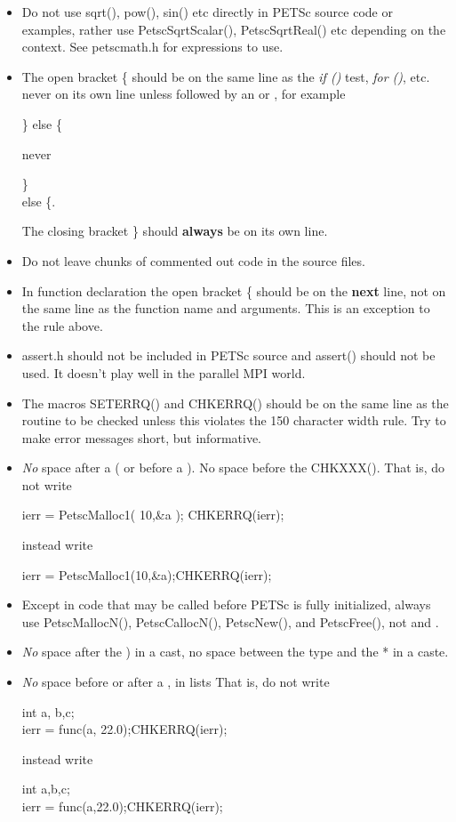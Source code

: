\documentclass[twoside,12pt]{../sty/report_petsc}
\begin{document}
\begin{itemize}
\item Do not use sqrt(), pow(), sin() etc directly in PETSc source code or examples, rather use PetscSqrtScalar(), PetscSqrtReal() etc depending on the context. See petscmath.h for expressions to use.
\item The open bracket \{ should be on the same line as the {\em if ()} test, {\em for ()}, etc. never on
      its own line unless followed by an  or , for example
\begin{tabbing}
   \} else \{ \\
\end{tabbing}
never
\begin{tabbing}
   \} \\
   else \{.
\end{tabbing}
 The closing bracket \} should {\bf always} be on its own line.
\item Do not leave chunks of commented out code in the source files.
\item In function declaration the open bracket \{ should be on the {\bf next} line, not on the same line as the function name and
      arguments. This is an exception to the rule above.
\item assert.h should not be included in PETSc source and assert() should not be used. It doesn't play well in the parallel MPI world.
\item The macros SETERRQ() and CHKERRQ() should be on the
      same line as the routine to be checked unless this violates the
      150 character width rule. Try to make error messages short, but
      informative.
\item {\em No} space after a ( or before a ). No space before the CHKXXX(). That is, do not write
\begin{tabbing}
   ierr = PetscMalloc1( 10,\&a ); CHKERRQ(ierr);
\end{tabbing}
instead write
\begin{tabbing}
   ierr = PetscMalloc1(10,\&a);CHKERRQ(ierr);
\end{tabbing}
\item Except in code that may be called before PETSc is fully initialized, always use PetscMallocN(), PetscCallocN(), PetscNew(), and PetscFree(), not  and .
\item {\em No} space after the ) in a cast, no space between the type and the * in a caste.
\item {\em No} space before or after a , in lists
That is, do not write
\begin{tabbing}
    int a, b,c;\\
    ierr = func(a, 22.0);CHKERRQ(ierr);
\end{tabbing}
instead write
\begin{tabbing}
    int a,b,c;\\
    ierr = func(a,22.0);CHKERRQ(ierr);
\end{tabbing}


\end{itemize}
\end{document}
